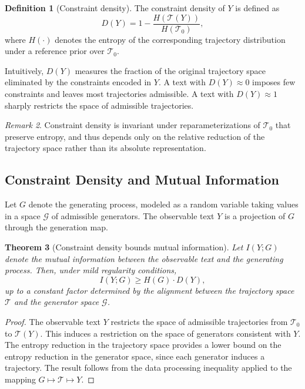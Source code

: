 \documentclass[12pt, oneside]{article}
\theoremstyle{plain}
\newtheorem{theorem}{Theorem}[section]
\theoremstyle{definition}
\newtheorem{definition}[theorem]{Definition}
\theoremstyle{remark}
\newtheorem{remark}[theorem]{Remark}
\begin{document}
\begin{definition}[Constraint density]
The constraint density of $Y$ is defined as
\[
  D(Y) = 1 - \frac{H(\mathcal{T}(Y))}{H(\mathcal{T}_0)},
\]
where $H(\cdot)$ denotes the entropy of the corresponding trajectory distribution
under a reference prior over $\mathcal{T}_0$.
\end{definition}

Intuitively, $D(Y)$ measures the fraction of the original trajectory space eliminated
by the constraints encoded in $Y$. A text with $D(Y) \approx 0$ imposes few constraints
and leaves most trajectories admissible. A text with $D(Y) \approx 1$ sharply restricts
the space of admissible trajectories.

\begin{remark}
Constraint density is invariant under reparameterizations of $\mathcal{T}_0$ that
preserve entropy, and thus depends only on the relative reduction of the trajectory
space rather than its absolute representation.
\end{remark}

\subsection{Constraint Density and Mutual Information}

Let $G$ denote the generating process, modeled as a random variable taking values
in a space $\mathcal{G}$ of admissible generators. The observable text $Y$ is a
projection of $G$ through the generation map.

\begin{theorem}[Constraint density bounds mutual information]
Let $I(Y; G)$ denote the mutual information between the observable text and the
generating process. Then, under mild regularity conditions,
\[
  I(Y; G) \geq H(G) \cdot D(Y),
\]
up to a constant factor determined by the alignment between the trajectory space
$\mathcal{T}$ and the generator space $\mathcal{G}$.
\end{theorem}

\begin{proof}
The observable text $Y$ restricts the space of admissible trajectories from
$\mathcal{T}_0$ to $\mathcal{T}(Y)$. This induces a restriction on the space of
generators consistent with $Y$. The entropy reduction in the trajectory space
provides a lower bound on the entropy reduction in the generator space, since
each generator induces a trajectory. The result follows from the data processing
inequality applied to the mapping $G \mapsto \mathcal{T} \mapsto Y$.
\end{proof}
\end{document}
